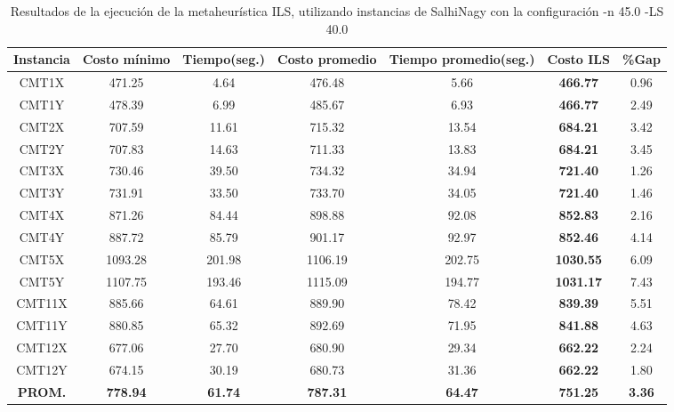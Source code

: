 \begin{table}[ht]
\caption{Resultados de la ejecución de la metaheurística ILS, utilizando instancias de SalhiNagy con la configuración -n 45.0 -LS 40.0}
\centering
\small
\begin{tabular}{c c c c c c c}
\hline\hline
Instancia & Costo mínimo & Tiempo(seg.) & Costo promedio & Tiempo promedio(seg.) & Costo ILS & \%Gap \\ [0.5ex]
\hline
CMT1X & 471.25 & 4.64 & 
476.48 & 5.66 & \bf{466.77} & 
0.96\\CMT1Y & 478.39 & 6.99 & 
485.67 & 6.93 & \bf{466.77} & 
2.49\\CMT2X & 707.59 & 11.61 & 
715.32 & 13.54 & \bf{684.21} & 
3.42\\CMT2Y & 707.83 & 14.63 & 
711.33 & 13.83 & \bf{684.21} & 
3.45\\CMT3X & 730.46 & 39.50 & 
734.32 & 34.94 & \bf{721.40} & 
1.26\\CMT3Y & 731.91 & 33.50 & 
733.70 & 34.05 & \bf{721.40} & 
1.46\\CMT4X & 871.26 & 84.44 & 
898.88 & 92.08 & \bf{852.83} & 
2.16\\CMT4Y & 887.72 & 85.79 & 
901.17 & 92.97 & \bf{852.46} & 
4.14\\CMT5X & 1093.28 & 201.98 & 
1106.19 & 202.75 & \bf{1030.55} & 
6.09\\CMT5Y & 1107.75 & 193.46 & 
1115.09 & 194.77 & \bf{1031.17} & 
7.43\\CMT11X & 885.66 & 64.61 & 
889.90 & 78.42 & \bf{839.39} & 
5.51\\CMT11Y & 880.85 & 65.32 & 
892.69 & 71.95 & \bf{841.88} & 
4.63\\CMT12X & 677.06 & 27.70 & 
680.90 & 29.34 & \bf{662.22} & 
2.24\\CMT12Y & 674.15 & 30.19 & 
680.73 & 31.36 & \bf{662.22} & 
1.80\\\bf{PROM.} & 
\bf{778.94} & \bf{61.74} & \bf{787.31} & \bf{64.47} & \bf{751.25} & \bf{3.36}\\[1ex]\hline
\end{tabular}
\label{table:nonlin}
\end{table} \clearpage

